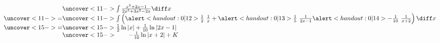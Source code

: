 \begin{frame}
\begin{example}[Example 2, p. 511]
\begin{columns}[t]
\abovedisplayskip=0pt
\belowdisplayskip=0pt
\[
\begin{array}{c@{}l}
&  \uncover<11->{\int \frac{x^2+2x-1}{2x^3+3x^2-2x}\diff x}\\%
\uncover<11->{ = } & %
\uncover<11->{%
\int \left( \alert<handout:0| 12>{\frac{1}{2}} \ \frac{1}{x} + \alert<handout:0| 13>{\frac{1}{5}} \ \frac{1}{2x-1} \alert<handout:0| 14>{- \frac{1}{10}} \ \frac{1}{x+2}\right) \diff x%
}\\%
\uncover<15->{ = } & %
\uncover<15->{%
\frac{1}{2}\ln |x| + \frac{1}{10}\ln |2x-1|%
}\\%
 & %
\uncover<15->{%
\qquad -\frac{1}{10}\ln |x+2| + K%
}%
\end{array}
\]
\end{columns}
\end{example}
\end{frame}
